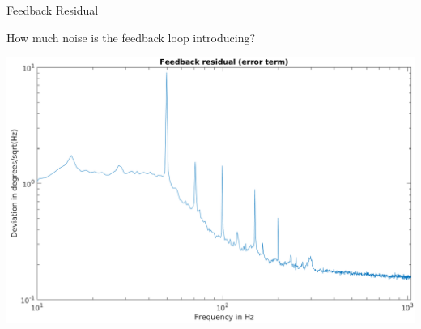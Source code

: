 \documentclass[xcolor=table]{beamer}
\begin{document}
%
\begin{frame}{Feedback Residual}

How much noise is the feedback loop introducing?

\includegraphics[width=\linewidth]{tune-residual.png}

\end{frame}
\end{document}
